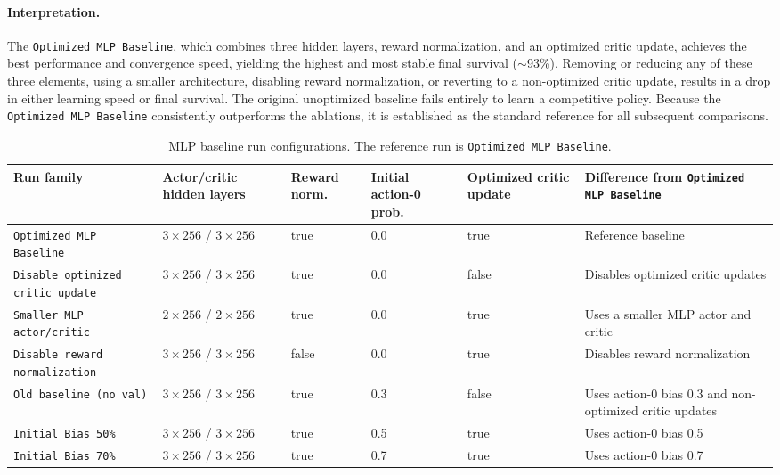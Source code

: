 \paragraph{Interpretation.}
The \texttt{Optimized MLP Baseline}, which combines three hidden layers, reward normalization, and an optimized critic update, achieves the best performance and convergence speed, yielding the highest and most stable final survival (\(\sim\)93\%). Removing or reducing any of these three elements, using a smaller architecture, disabling reward normalization, or reverting to a non-optimized critic update, results in a drop in either learning speed or final survival. The original unoptimized baseline fails entirely to learn a competitive policy. Because the \texttt{Optimized MLP Baseline} consistently outperforms the ablations, it is established as the standard reference for all subsequent comparisons.

\begin{table}[H]
  \centering
  \scriptsize
  \caption{MLP baseline run configurations. The reference run is
  \texttt{Optimized MLP Baseline}.}
  \label{tab:a0-run-configurations}
  \setlength{\tabcolsep}{3pt}
  \begin{tabular}{L{0.25\textwidth}L{0.13\textwidth}L{0.09\textwidth}L{0.11\textwidth}L{0.11\textwidth}L{0.20\textwidth}}
    \toprule
    Run family & Actor/critic hidden layers & Reward norm. & Initial action-0 prob. &
    Optimized critic update & Difference from \texttt{Optimized MLP Baseline} \\
    \midrule
    \texttt{Optimized MLP Baseline} & \(3\times256\) / \(3\times256\) &
    true & 0.0 & true & Reference baseline \\
    \texttt{Disable optimized critic update} & \(3\times256\) / \(3\times256\) &
    true & 0.0 & false & Disables optimized critic updates \\
    \texttt{Smaller MLP actor/critic} & \(2\times256\) / \(2\times256\) &
    true & 0.0 & true & Uses a smaller MLP actor and critic \\
    \texttt{Disable reward normalization} & \(3\times256\) / \(3\times256\) &
    false & 0.0 & true & Disables reward normalization \\
    \texttt{Old baseline (no val)} & \(3\times256\) / \(3\times256\) &
    true & 0.3 & false & Uses action-0 bias 0.3 and non-optimized critic updates \\
    \texttt{Initial Bias 50\%} & \(3\times256\) / \(3\times256\) &
    true & 0.5 & true & Uses action-0 bias 0.5 \\
    \texttt{Initial Bias 70\%} & \(3\times256\) / \(3\times256\) &
    true & 0.7 & true & Uses action-0 bias 0.7 \\
    \bottomrule
  \end{tabular}
\end{table}

